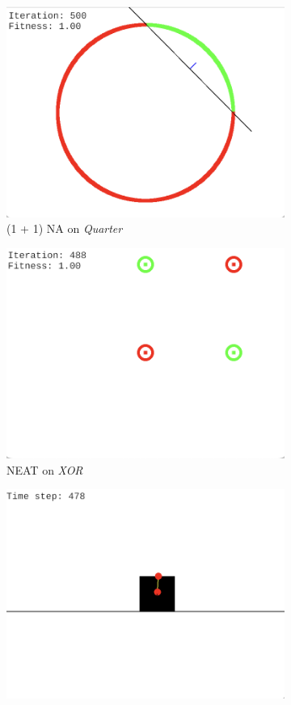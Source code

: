 \begin{figure}
    \centering
    \begin{subfigure}{0.5\textwidth}
        \centering
        \includegraphics[width=0.8\linewidth]{Pictures/oneplusonena_gui}
        \caption{(1 + 1) NA on \textit{Quarter}}
    \end{subfigure}%
    \hfill
    \begin{subfigure}{0.5\textwidth}
        \centering
        \includegraphics[width=0.8\linewidth]{Pictures/xor_gui}
        \caption{NEAT on \textit{XOR}}
    \end{subfigure}%
    \hfill
    \begin{subfigure}{0.5\textwidth}
        \centering
        \includegraphics[width=0.8\linewidth]{Pictures/pole_balancing_gui}

\end{subfigure}
\end{figure}
